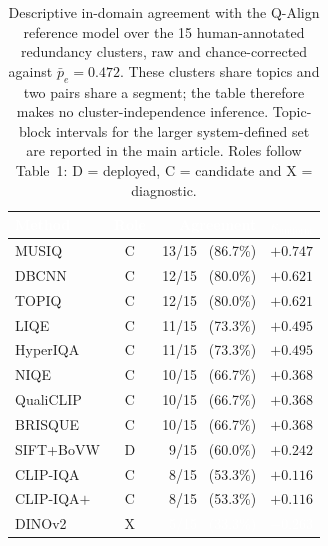 \documentclass[sn-basic,Numbered]{sn-jnl}
\newcommand{\pfB}[1]{\cellcolor{perf4}#1}
\newcommand{\pfC}[1]{\cellcolor{perf3}#1}
\newcommand{\pfD}[1]{\cellcolor{perf2}#1}
\newcommand{\pfE}[1]{\cellcolor{perf1}\textcolor{white}{#1}}
\newcommand{\hd}[1]{\textcolor{white}{\textbf{#1}}}
\begin{document}
\begin{table}[!ht]
\centering
\caption{Descriptive in-domain agreement with the Q-Align reference model over
the 15 human-annotated redundancy clusters, raw and chance-corrected against
$\bar{p}_e = 0.472$. These clusters share topics and two pairs share a segment;
the table therefore makes no cluster-independence inference. Topic-block
intervals for the larger system-defined set are reported in the main article.
Roles follow Table~1: D = deployed, C = candidate and X = diagnostic.}
\label{tab:agree}
\small
\setlength{\tabcolsep}{6pt}
\renewcommand{\arraystretch}{1.14}
\begin{tabular}{@{}l c r r@{}}
\toprule
\rowcolor{headerblue}
\hd{Method} & \hd{Role} & \hd{Agreement} & \hd{$\kappa_{\mathrm{uniform}}$} \\
\midrule
\rowcolor{rowlight} MUSIQ     & C & \pfB{13/15 \ (86.7\%)} & \pfB{$+0.747$} \\
\rowcolor{rowwhite} DBCNN     & C & \pfB{12/15 \ (80.0\%)} & \pfB{$+0.621$} \\
\rowcolor{rowlight} TOPIQ     & C & \pfB{12/15 \ (80.0\%)} & \pfB{$+0.621$} \\
\rowcolor{rowwhite} LIQE      & C & \pfB{11/15 \ (73.3\%)} & \pfB{$+0.495$} \\
\rowcolor{rowlight} HyperIQA  & C & \pfB{11/15 \ (73.3\%)} & \pfB{$+0.495$} \\
\rowcolor{rowwhite} NIQE      & C & \pfC{10/15 \ (66.7\%)} & \pfC{$+0.368$} \\
\rowcolor{rowlight} QualiCLIP & C & \pfC{10/15 \ (66.7\%)} & \pfC{$+0.368$} \\
\rowcolor{rowwhite} BRISQUE   & C & \pfC{10/15 \ (66.7\%)} & \pfC{$+0.368$} \\
\rowcolor{rowlight} SIFT+BoVW & D & \pfD{\ \,9/15 \ (60.0\%)} & \pfD{$+0.242$} \\
\rowcolor{rowwhite} CLIP-IQA  & C & \pfD{\ \,8/15 \ (53.3\%)} & \pfD{$+0.116$} \\
\rowcolor{rowlight} CLIP-IQA$+$ & C & \pfD{\ \,8/15 \ (53.3\%)} & \pfD{$+0.116$} \\
\rowcolor{rowwhite} DINOv2    & X & \pfE{\ \,5/15 \ (33.3\%)} & \pfE{$-0.263$} \\
\bottomrule
\end{tabular}
\end{table}
\end{document}
